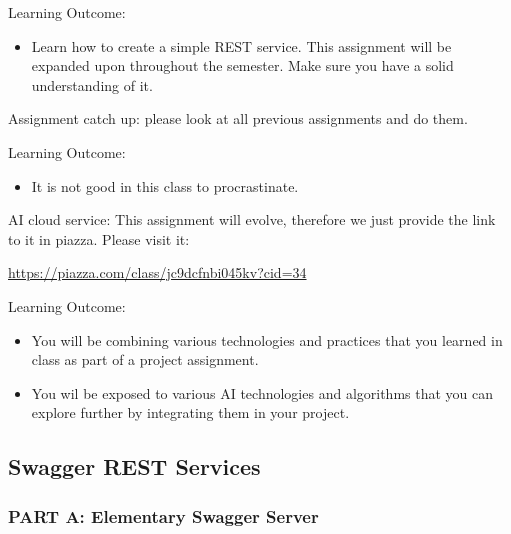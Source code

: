 Learning Outcome:
\begin{itemize}
\item Learn how to create a simple REST service. This assignment will
  be expanded upon throughout the semester. Make sure you have a solid
  understanding of it.
\end{itemize}

\begin{exercise}
Assignment catch up: please look at all previous assignments and do
them. 
\end{exercise}


Learning Outcome:
\begin{itemize}
\item It is not good in this class to procrastinate.
\end{itemize}

\begin{exercise}

AI cloud service: This assignment will evolve, therefore we just
provide the link to it in piazza. Please visit it:

\url{https://piazza.com/class/jc9dcfnbi045kv?cid=34}
\end{exercise}


Learning Outcome:
\begin{itemize}
\item You will be combining various technologies and practices that
  you learned in class as part of a project assignment.
\item You wil be exposed to various AI technologies and algorithms
  that you can explore further by integrating them in your project.
\end{itemize}



\subsection{Swagger REST Services}
\label{E:REST-swagger}
\subsubsection{PART A: Elementary Swagger Server}
 
